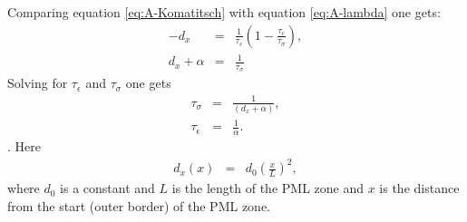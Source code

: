 \documentclass[11pt]{article}
\begin{document}
Comparing equation \eqref{eq:A-Komatitsch} with equation
\eqref{eq:A-lambda} one gets:
\begin{eqnarray}
-d_x         & = & \frac{1}{\tau_{\epsilon}}\left(1-\frac{\tau_{\epsilon}}
                                            {\tau_{\sigma}}\right), \\
d_x +\alpha & = & \frac{1}{\tau_{\sigma}}
\end{eqnarray}
Solving for $\tau_{\epsilon}$ and $\tau_{\sigma}$ one gets
\begin{eqnarray}
  \tau_{\sigma}   & = & \frac{1}{(d_x+\alpha)},\\
  \tau_{\epsilon} & = & \frac{1}{\alpha}.
\end{eqnarray}.
Here 
\begin{eqnarray}
 d_x (x) & = & d_0 \left(\frac{x}{L}\right)^2,
\end{eqnarray}
where $d_0$ is a constant and $L$ is the length of
the PML zone and $x$ is the distance from the start (outer border)
of the PML zone.
\end{document}
